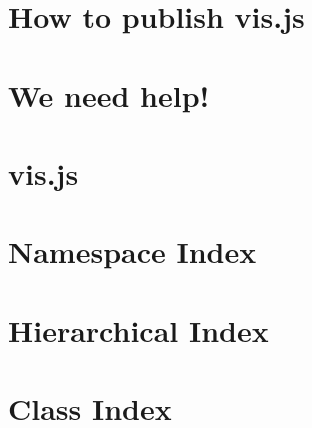 \documentclass[twoside]{book}
\newcommand{\+}{\discretionary{\mbox{\scriptsize$\hookleftarrow$}}{}{}}
\begin{document}
\chapter{How to publish vis.\+js}
\label{md__c_1__users__ahmet__ercan__tekden__documents_bounswe2016group12__w_e_b-_b_a_c_k_e_n_d__meanco28cf1e95183ef7200986aa39a846149e}
\hypertarget{md__c_1__users__ahmet__ercan__tekden__documents_bounswe2016group12__w_e_b-_b_a_c_k_e_n_d__meanco28cf1e95183ef7200986aa39a846149e}{}

\chapter{We need help!}
\label{md__c_1__users__ahmet__ercan__tekden__documents_bounswe2016group12__w_e_b-_b_a_c_k_e_n_d__meancoebb8cce49ee4c628b6739dd7b86b60aa}
\hypertarget{md__c_1__users__ahmet__ercan__tekden__documents_bounswe2016group12__w_e_b-_b_a_c_k_e_n_d__meancoebb8cce49ee4c628b6739dd7b86b60aa}{}

\chapter{vis.\+js}
\label{md__c_1__users__ahmet__ercan__tekden__documents_bounswe2016group12__w_e_b-_b_a_c_k_e_n_d__meancof580d9b3bd4a76057c3908b95a85ecec}
\hypertarget{md__c_1__users__ahmet__ercan__tekden__documents_bounswe2016group12__w_e_b-_b_a_c_k_e_n_d__meancof580d9b3bd4a76057c3908b95a85ecec}{}

\chapter{Namespace Index}

\chapter{Hierarchical Index}

\chapter{Class Index}

\end{document}
